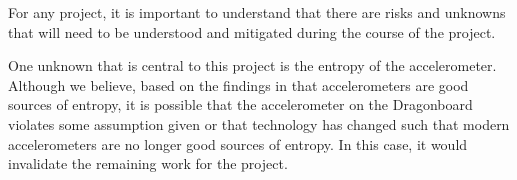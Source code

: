 For any project, it is important to understand that there are risks and unknowns
that will need to be understood and mitigated during the course of the project. 

One unknown that is central to this project is the entropy of the
accelerometer.  Although we believe, based on the findings in \cite{voris} that
accelerometers are good sources of entropy, it is possible that the
accelerometer on the Dragonboard violates some assumption given or that
technology has changed such that modern accelerometers are no longer good
sources of entropy. In this case, it would invalidate the remaining work for the
project. 
